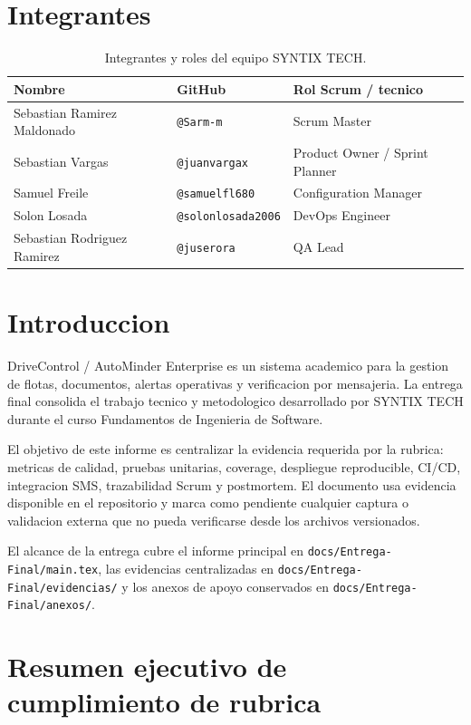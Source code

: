 \documentclass[11pt,a4paper]{article}
\begin{document}
\section*{Integrantes}
{}
\begin{table}[H]
\centering
\begin{tabularx}{\linewidth}{P{5.2cm}P{3.4cm}Y}
\toprule
\textbf{Nombre} & \textbf{GitHub} & \textbf{Rol Scrum / tecnico} \\
\midrule
Sebastian Ramirez Maldonado & \texttt{@Sarm-m} & Scrum Master \\
Sebastian Vargas & \texttt{@juanvargax} & Product Owner / Sprint Planner \\
Samuel Freile & \texttt{@samuelfl680} & Configuration Manager \\
Solon Losada & \texttt{@solonlosada2006} & DevOps Engineer \\
Sebastian Rodriguez Ramirez & \texttt{@juserora} & QA Lead \\
\bottomrule
\end{tabularx}
\caption{Integrantes y roles del equipo SYNTIX TECH.}
\end{table}

\clearpage
{}
\tableofcontents
\clearpage

\section{Introduccion}

DriveControl / AutoMinder Enterprise es un sistema academico para la gestion de flotas, documentos, alertas operativas y verificacion por mensajeria. La entrega final consolida el trabajo tecnico y metodologico desarrollado por SYNTIX TECH durante el curso Fundamentos de Ingenieria de Software.

El objetivo de este informe es centralizar la evidencia requerida por la rubrica: metricas de calidad, pruebas unitarias, coverage, despliegue reproducible, CI/CD, integracion SMS, trazabilidad Scrum y postmortem. El documento usa evidencia disponible en el repositorio y marca como pendiente cualquier captura o validacion externa que no pueda verificarse desde los archivos versionados.

El alcance de la entrega cubre el informe principal en \texttt{docs/Entrega-Final/main.tex}, las evidencias centralizadas en \texttt{docs/Entrega-Final/evidencias/} y los anexos de apoyo conservados en \texttt{docs/Entrega-Final/anexos/}. 
\section{Resumen ejecutivo de cumplimiento de rubrica}
\end{document}
